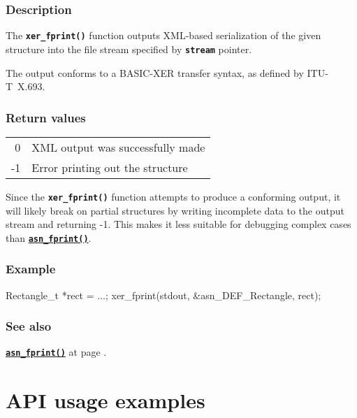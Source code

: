 \documentclass[english,oneside,12pt]{book}
\newcommand{\api}[2]{\hyperref[#1]{\code{#2}}}
\newcommand{\seealso}[2]{\api{#1}{#2} at page \pageref{#1}}
\newcommand{\code}[1]{\texttt{\textbf{\lstinline{#1}}}}
\begin{document}
\subsection*{Description}

The \code{xer_fprint()} function outputs XML-based serialization
of the given structure into the file stream specified by
\code{stream} pointer.

The output conforms to a BASIC-XER transfer syntax, as defined by ITU-T~X.693.

\subsection*{Return values}

\begin{tabular}[h!]{rl}
0 & XML output was successfully made \\
-1 & Error printing out the structure
\end{tabular}

\noindent{}Since the \code{xer_fprint()} function attempts to produce a conforming output,
it will likely break on partial structures by writing incomplete data
to the output stream and returning -1. This makes it less suitable for
debugging complex cases than \api{sec:asn_fprint}{asn_fprint()}.

\subsection*{Example}
\begin{example}
Rectangle_t *rect = ...;
xer_fprint(stdout, &asn_DEF_Rectangle, rect);
\end{example}

\subsection*{See also}
\seealso{sec:asn_fprint}{asn_fprint()}.

\chapter{API usage examples}
\end{document}
